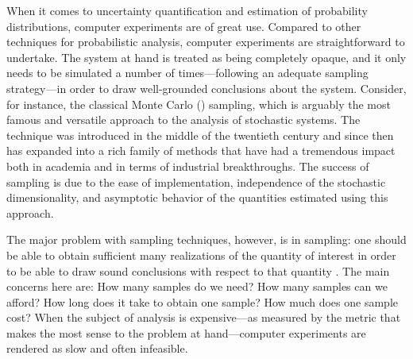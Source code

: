 When it comes to uncertainty quantification and estimation of probability
distributions, computer experiments \cite{santner2003} are of great use.
Compared to other techniques for probabilistic analysis, computer experiments
are straightforward to undertake. The system at hand is treated as being
completely opaque, and it only needs to be simulated a number of
times---following an adequate sampling strategy---in order to draw well-grounded
conclusions about the system. Consider, for instance, the classical Monte Carlo
() sampling, which is arguably the most famous and versatile approach
to the analysis of stochastic systems. The technique was introduced in the
middle of the twentieth century and since then has expanded into a rich family
of methods that have had a tremendous impact both in academia and in terms of
industrial breakthroughs. The success of  sampling is due to the ease
of implementation, independence of the stochastic dimensionality, and asymptotic
behavior of the quantities estimated using this approach.

The major problem with sampling techniques, however, is in sampling: one should
be able to obtain sufficient many realizations of the quantity of interest in
order to be able to draw sound conclusions with respect to that quantity
\cite{diaz-emparanza2002}. The main concerns here are: How many samples do we
need? How many samples can we afford? How long does it take to obtain one
sample? How much does one sample cost? When the subject of analysis is
expensive---as measured by the metric that makes the most sense to the problem
at hand---computer experiments are rendered as slow and often infeasible.


